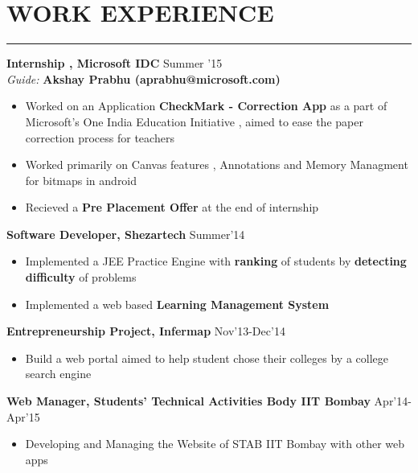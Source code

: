 \documentclass[11pt]{article} %
\begin{document}
\vspace*{40mm}

\section*{WORK EXPERIENCE}
\vspace{-2mm}
\hrule
\medskip


\noindent \textbf{Internship , Microsoft IDC} \hfill Summer '15\\
\textit{Guide:} \textbf{Akshay Prabhu  (aprabhu@microsoft.com)}
\vspace{-2mm}
\begin{itemize}
\itemsep-0.4em
\item Worked on an Application \textbf{CheckMark - Correction App} as a part of Microsoft's One India Education Initiative , aimed to ease the paper correction process for teachers
\item Worked primarily on Canvas features , Annotations and Memory Managment for bitmaps in android
\item Recieved a \textbf{Pre Placement Offer} at the end of internship
\end{itemize}
\vspace{-1mm}

\noindent \textbf{Software Developer, Shezartech} \hfill Summer'14
\vspace{-2mm}
\begin{itemize}
\itemsep-0.4em
\item Implemented a JEE Practice Engine with {\bf ranking} of students by {\bf detecting difficulty} of problems
\item Implemented a web based {\bf Learning Management System}
\end{itemize}
\vspace{-1mm}

\noindent \textbf{Entrepreneurship Project, Infermap} \hfill Nov'13-Dec'14
\vspace{-2mm}
\begin{itemize}
\itemsep-0.4em
\item Build a web portal aimed to help student chose their colleges by a college search engine
\end{itemize}
\vspace{-1mm}

\noindent \textbf{Web Manager, Students' Technical Activities Body IIT Bombay} \hfill Apr'14-Apr'15
\vspace{-2mm}
\begin{itemize}
\itemsep-0.3em
\item Developing and Managing the Website of STAB IIT Bombay with other web apps 
\end{itemize}
\vspace{-6mm}
\end{document}
